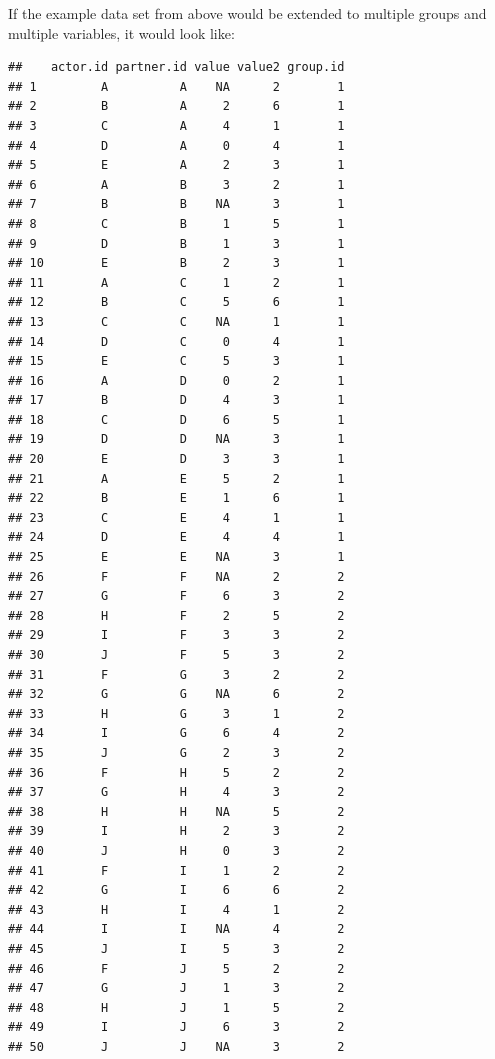 \documentclass[a4paper]{article}\usepackage[]{graphicx}\usepackage[]{color}
\makeatletter
\newenvironment{kframe}{%
 \def\at@end@of@kframe{}%
 \ifinner\ifhmode%
  \def\at@end@of@kframe{\end{minipage}}%
  \begin{minipage}{\columnwidth}%
 \fi\fi%
 \def\FrameCommand##1{\hskip\@totalleftmargin \hskip-\fboxsep
 \colorbox{shadecolor}{##1}\hskip-\fboxsep
     \hskip-\linewidth \hskip-\@totalleftmargin \hskip\columnwidth}%
 \MakeFramed {\advance\hsize-\width
   \@totalleftmargin\z@ \linewidth\hsize
   \@setminipage}}%
 {\par\unskip\endMakeFramed%
 \at@end@of@kframe}
\newenvironment{knitrout}{}{} %
\makeatother
\begin{document}
If the example data set from above would be extended to multiple groups and multiple variables, it would look like:

\begin{knitrout}\small
{}\color{fgcolor}\begin{kframe}
\begin{verbatim}
##    actor.id partner.id value value2 group.id
## 1         A          A    NA      2        1
## 2         B          A     2      6        1
## 3         C          A     4      1        1
## 4         D          A     0      4        1
## 5         E          A     2      3        1
## 6         A          B     3      2        1
## 7         B          B    NA      3        1
## 8         C          B     1      5        1
## 9         D          B     1      3        1
## 10        E          B     2      3        1
## 11        A          C     1      2        1
## 12        B          C     5      6        1
## 13        C          C    NA      1        1
## 14        D          C     0      4        1
## 15        E          C     5      3        1
## 16        A          D     0      2        1
## 17        B          D     4      3        1
## 18        C          D     6      5        1
## 19        D          D    NA      3        1
## 20        E          D     3      3        1
## 21        A          E     5      2        1
## 22        B          E     1      6        1
## 23        C          E     4      1        1
## 24        D          E     4      4        1
## 25        E          E    NA      3        1
## 26        F          F    NA      2        2
## 27        G          F     6      3        2
## 28        H          F     2      5        2
## 29        I          F     3      3        2
## 30        J          F     5      3        2
## 31        F          G     3      2        2
## 32        G          G    NA      6        2
## 33        H          G     3      1        2
## 34        I          G     6      4        2
## 35        J          G     2      3        2
## 36        F          H     5      2        2
## 37        G          H     4      3        2
## 38        H          H    NA      5        2
## 39        I          H     2      3        2
## 40        J          H     0      3        2
## 41        F          I     1      2        2
## 42        G          I     6      6        2
## 43        H          I     4      1        2
## 44        I          I    NA      4        2
## 45        J          I     5      3        2
## 46        F          J     5      2        2
## 47        G          J     1      3        2
## 48        H          J     1      5        2
## 49        I          J     6      3        2
## 50        J          J    NA      3        2
\end{verbatim}
\end{kframe}
\end{knitrout}
\end{document}
